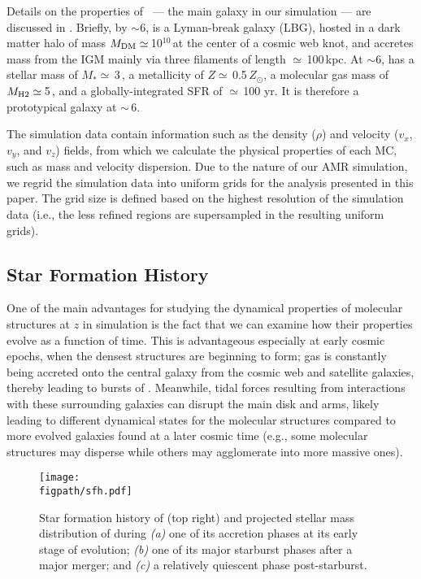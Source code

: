 \IfFileExists{emulateapjlegacy.cls}{\documentclass[iop]{emulateapjlegacy}}{\documentclass[iop]{emulateapj}}
\begin{document}
Details on the properties of \flower\ --- the main galaxy in our simulation --- are discussed in \citet{Pallottini17b}.
Briefly, by \z$\sim$6, \flower is a Lyman-break galaxy (LBG), hosted in a dark matter halo of mass $M_{\rm DM}\simeq$\,10$^{10}$\,\Msun at the center of a cosmic web knot, and accretes mass from the IGM mainly via three filaments of length $\simeq$\,100\,kpc. At \z$\sim$6, \flower has a stellar mass of $M_*\simeq$\,3\,\Msun, a metallicity of $Z\simeq$\,0.5\,$Z_{\odot}$, a molecular gas mass of $M_{\rm H2}\simeq$\,5\,\Msun, and a globally-integrated SFR of $\simeq$\,100\,\Msun\,yr\pmOne. It is therefore a prototypical galaxy at \z$\sim$\,6.

The simulation data contain information such as the density ($\rho$) and velocity ($v_x$, $v_y$, and $v_z$) fields, from which we calculate
the physical properties of each MC, such as mass and velocity dispersion.
Due to the nature of our AMR simulation, we regrid the simulation data into uniform grids for the analysis presented in this paper.
The grid size is defined
based on the highest resolution of the simulation data (i.e., the less refined regions are supersampled in the resulting uniform grids).



\subsection{Star Formation History} \label{sec:sfh}
One of the main advantages for studying the dynamical properties of molecular structures at
$z$ in simulation is the fact that we can examine how their properties evolve
as a function of time.
This is advantageous especially at early cosmic epochs,
when the densest structures are beginning to form;
gas is constantly being accreted onto the central galaxy from the cosmic web and
satellite galaxies, thereby leading to bursts of \SF.
Meanwhile, tidal forces resulting from interactions with these surrounding
galaxies can disrupt the main disk and arms, likely leading to different dynamical states
for the molecular structures compared to more evolved galaxies found at
a later cosmic time (e.g., some molecular structures may disperse while others may agglomerate into more massive
ones). %

\begin{figure*}[!htbp]
\centering
\texttt{[image: \\figpath/sfh.pdf]}
\caption{
    Star formation history of \flower (top right) and
    projected stellar mass distribution of \flower during 
    {\it (a)} one of its accretion phases
    at its early stage of evolution; 
    {\it (b)} one of its major starburst phases
    after a major merger; and
    {\it (c)} a relatively quiescent phase post-starburst.
\label{fig:SFH}}
\end{figure*}
\end{document}
